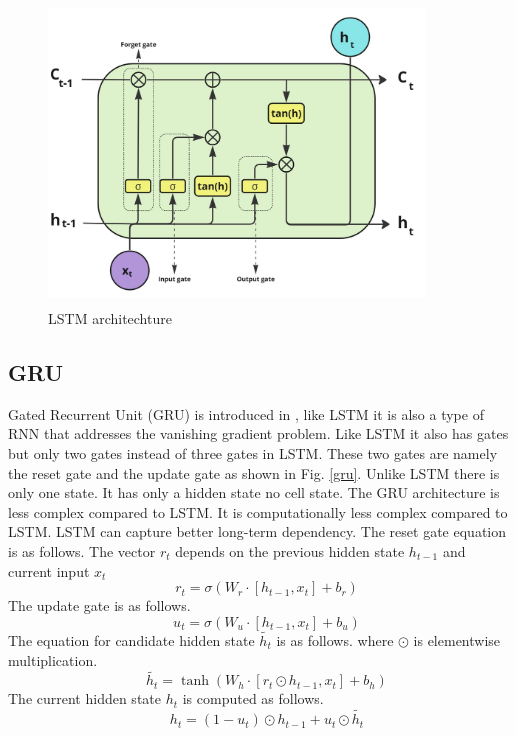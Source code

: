 \documentclass[preprint,12pt]{elsarticle}
\begin{document}
\begin{center}
	\begin{figure}[!htbp]
		\centering
		\includegraphics[width=10cm, height=8cm]{LSTM.jpg}
		\caption{LSTM architechture}
		\label{lstm1}
	\end{figure}
\end{center}


\subsection{GRU}
\par Gated Recurrent Unit (GRU) is introduced in \cite{cho2014learning}, like LSTM it is also a type of RNN that addresses the vanishing gradient problem. Like LSTM it also has gates but only two gates instead of three gates in LSTM. These two gates are namely the reset gate and the update gate as shown in Fig. \ref{gru}. Unlike LSTM there is only one state. It has only a hidden state no cell state. The GRU architecture is less complex compared to LSTM. It is computationally less complex compared to LSTM. LSTM can capture better long-term dependency. The reset gate equation is as follows. The vector $r_t$ depends on the previous hidden state $h_{t-1}$ and current input $x_t$
\begin{equation}
	\quad r_t = \sigma(W_{r} \cdot [h_{t-1},x_t] + b_{r})
\end{equation}
The update gate is as follows. 
\begin{equation}
	\quad u_t = \sigma(W_{u} \cdot [h_{t-1},x_t] + b_{u})
\end{equation} 
The equation for candidate hidden state $\tilde{h_t}$ is as follows. where $\odot$ is elementwise multiplication.  
\begin{equation}
	\quad \tilde{h_t}= \tanh(W_{h} \cdot [r_t\odot h_{t-1},x_t] + b_{h})
\end{equation}
The current hidden state ${h_t}$ is computed as follows.
\begin{equation}
	\quad {h_t}= (1-u_t) \odot h_{t-1} + u_t \odot \tilde{h_t}
\end{equation}
\end{document}
